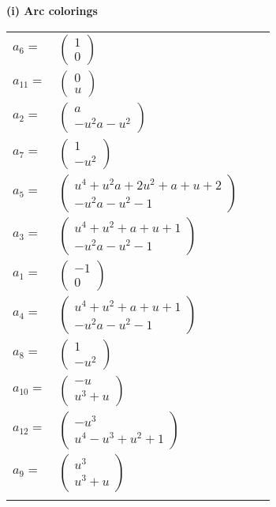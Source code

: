 \documentclass[1p]{elsarticle_modified}
\theoremstyle{definition}
\begin{document}
\flushleft \textbf{(i) Arc colorings}\\
\begin{tabular}{m{7pt} m{180pt} m{7pt} m{180pt} }
\flushright $a_{6}=$&$\begin{pmatrix}1\\0\end{pmatrix}$ \\
\flushright $a_{11}=$&$\begin{pmatrix}0\\u\end{pmatrix}$ \\
\flushright $a_{2}=$&$\begin{pmatrix}a\\- u^2 a- u^2\end{pmatrix}$ \\
\flushright $a_{7}=$&$\begin{pmatrix}1\\- u^2\end{pmatrix}$ \\
\flushright $a_{5}=$&$\begin{pmatrix}u^4+u^2 a+2 u^2+a+u+2\\- u^2 a- u^2-1\end{pmatrix}$ \\
\flushright $a_{3}=$&$\begin{pmatrix}u^4+u^2+a+u+1\\- u^2 a- u^2-1\end{pmatrix}$ \\
\flushright $a_{1}=$&$\begin{pmatrix}-1\\0\end{pmatrix}$ \\
\flushright $a_{4}=$&$\begin{pmatrix}u^4+u^2+a+u+1\\- u^2 a- u^2-1\end{pmatrix}$ \\
\flushright $a_{8}=$&$\begin{pmatrix}1\\- u^2\end{pmatrix}$ \\
\flushright $a_{10}=$&$\begin{pmatrix}- u\\u^3+u\end{pmatrix}$ \\
\flushright $a_{12}=$&$\begin{pmatrix}- u^3\\u^4- u^3+u^2+1\end{pmatrix}$ \\
\flushright $a_{9}=$&$\begin{pmatrix}u^3\\u^3+u\end{pmatrix}$\\&\end{tabular}
\end{document}
